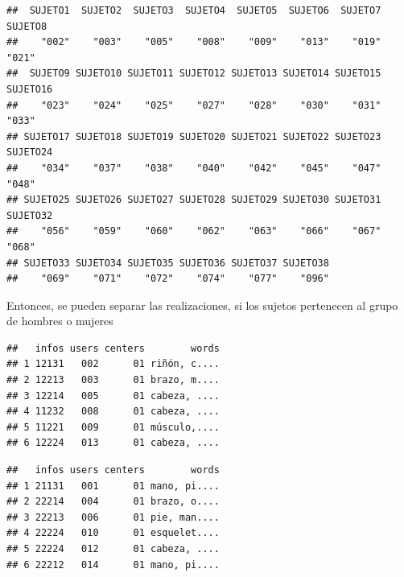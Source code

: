 \documentclass[
]{article}
\newenvironment{Shaded}{\begin{snugshade}}{\end{snugshade}}
\newcommand{\KeywordTok}[1]{\textcolor[rgb]{0.13,0.29,0.53}{\textbf{#1}}}
\newcommand{\NormalTok}[1]{#1}
\newcommand{\OperatorTok}[1]{\textcolor[rgb]{0.81,0.36,0.00}{\textbf{#1}}}
\newcommand{\StringTok}[1]{\textcolor[rgb]{0.31,0.60,0.02}{#1}}
\begin{document}
\begin{verbatim}
##  SUJETO1  SUJETO2  SUJETO3  SUJETO4  SUJETO5  SUJETO6  SUJETO7  SUJETO8 
##    "002"    "003"    "005"    "008"    "009"    "013"    "019"    "021" 
##  SUJETO9 SUJETO10 SUJETO11 SUJETO12 SUJETO13 SUJETO14 SUJETO15 SUJETO16 
##    "023"    "024"    "025"    "027"    "028"    "030"    "031"    "033" 
## SUJETO17 SUJETO18 SUJETO19 SUJETO20 SUJETO21 SUJETO22 SUJETO23 SUJETO24 
##    "034"    "037"    "038"    "040"    "042"    "045"    "047"    "048" 
## SUJETO25 SUJETO26 SUJETO27 SUJETO28 SUJETO29 SUJETO30 SUJETO31 SUJETO32 
##    "056"    "059"    "060"    "062"    "063"    "066"    "067"    "068" 
## SUJETO33 SUJETO34 SUJETO35 SUJETO36 SUJETO37 SUJETO38 
##    "069"    "071"    "072"    "074"    "077"    "096"
\end{verbatim}

Entonces, se pueden separar las realizaciones, si los sujetos pertenecen
al grupo de hombres o mujeres

\begin{Shaded}
\end{Shaded}

\begin{verbatim}
##   infos users centers        words
## 1 12131   002      01 riñón, c....
## 2 12213   003      01 brazo, m....
## 3 12214   005      01 cabeza, ....
## 4 11232   008      01 cabeza, ....
## 5 11221   009      01 músculo,....
## 6 12224   013      01 cabeza, ....
\end{verbatim}

\begin{Shaded}
\end{Shaded}

\begin{verbatim}
##   infos users centers        words
## 1 21131   001      01 mano, pi....
## 2 22214   004      01 brazo, o....
## 3 22213   006      01 pie, man....
## 4 22224   010      01 esquelet....
## 5 22224   012      01 cabeza, ....
## 6 22212   014      01 mano, pi....
\end{verbatim}
\end{document}
